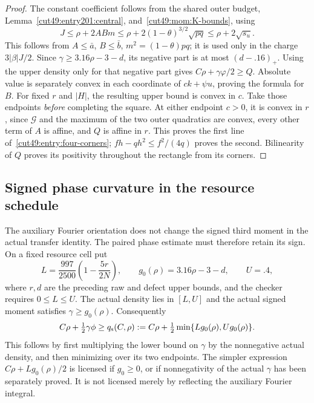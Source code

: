 \documentclass[11pt,a4paper]{article}
\numberwithin{equation}{section}
\theoremstyle{definition}
\theoremstyle{remark}
\begin{document}
\begin{proof}
The constant coefficient follows from the shared outer budget,
Lemma~\ref{cut49:entry201:central}, and~\eqref{cut49:mom:K-bounds}, using
\[
 J\le\rho+2ABm\le\rho+2(1-\theta)^{3/2}\sqrt{pq}
       \le\rho+2\sqrt{s_u}.
\]
This follows from $A\le\bar a$, $B\le\bar b$, $m^2=(1-\theta)pq$;
it is used only in the charge $3|\beta|J/2$. Since $\gamma\ge3.16\rho-3-d$, its negative
part is at most $(d-.16)_+$. Using the upper density only for that negative
part gives $C\rho+\gamma\varphi/2\ge Q$. Absolute value is separately
convex in each coordinate of $ck+\psi u$, proving the formula for $B$.
For fixed $r$ and $|H|$, the resulting upper bound is convex in $c$.
Take those endpoints \emph{before} completing the square. At either
endpoint $c>0$, it is convex in $r$, since $\mathcal G$ and the maximum of the two outer quadratics are
convex, every other term of $A$ is affine, and $Q$ is affine in $r$. This proves the first line of~\eqref{cut49:entry:four-corners};
$fh-qh^2\le f^2/(4q)$ proves the second. Bilinearity of $Q$ proves
its positivity throughout the rectangle from its corners.

\end{proof}

\subsection{Signed phase curvature in the resource schedule}
\label{cut49:re:signed-phase-repair}
The auxiliary Fourier orientation does not change the signed third moment
in the actual transfer identity. The paired phase estimate must therefore
retain its sign. On a fixed resource cell put
\[
 L=\frac{997}{2500}\left(1-\frac{5r}{2N}\right),\qquad
 g_0(\rho)=3.16\rho-3-d,\qquad U=.4,
\]
where $r,d$ are the preceding raw and defect upper bounds, and the
checker requires $0\le L\le U$. The actual density lies in $[L,U]$
and the actual signed moment satisfies $\gamma\ge g_0(\rho)$. Consequently
\begin{equation}\label{cut49:re:sign-aware-price}
 C\rho+\tfrac12\gamma\phi
 \ge q_{\rm s}(C,\rho):=
 C\rho+\tfrac12\min\{L g_0(\rho),U g_0(\rho)\}.
\end{equation}
This follows by first multiplying the lower bound on $\gamma$ by the
nonnegative actual density, and then minimizing over its two endpoints.
The simpler expression $C\rho+Lg_0(\rho)/2$ is licensed if $g_0\ge0$,
or if nonnegativity of the actual $\gamma$ has been separately proved.
It is not licensed merely by reflecting the auxiliary Fourier integral.
\end{document}
